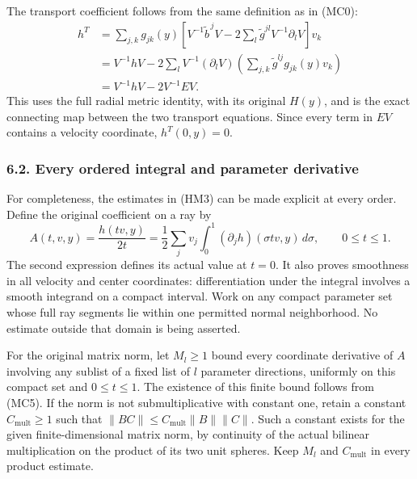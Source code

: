 \documentclass[
  11pt,
]{article}
\begin{document}
The transport coefficient follows from the same definition as in (MC0):
\[
\begin{split}
 h^{T}
 &=\sum_{j,k}g_{jk}(y)
           \left[V^{-1}\widetilde b^{\,j}V
              -2\sum_l\widetilde g^{jl}V^{-1}\partial_lV\right]v_k\\
 &=V^{-1}hV
       -2\sum_lV^{-1}(\partial_lV)
                  \left(\sum_{j,k}\widetilde g^{lj}g_{jk}(y)v_k\right)\\
 &=V^{-1}hV-2V^{-1}EV .
\end{split}
\tag{MC4}
\] This uses the full radial metric identity, with its original
\(H(y)\), and is the exact connecting map between the two transport
equations. Since every term in \(EV\) contains a velocity coordinate,
\(h^{T}(0,y)=0\).

\subsubsection{6.2. Every ordered integral and parameter
derivative}\label{every-ordered-integral-and-parameter-derivative}

For completeness, the estimates in (HM3) can be made explicit at every
order. Define the original coefficient on a ray by \[
 A(t,v,y)=\frac{h(tv,y)}{2t}
 =\frac12\sum_jv_j\int_0^1
          (\partial_jh)(\sigma tv,y)\,d\sigma,\qquad 0\leq t\leq1.
 \tag{MC5}
\] The second expression defines its actual value at \(t=0\). It also
proves smoothness in all velocity and center coordinates:
differentiation under the integral involves a smooth integrand on a
compact interval. Work on any compact parameter set whose full ray
segments lie within one permitted normal neighborhood. No estimate
outside that domain is being asserted.

For the original matrix norm, let \(M_l\geq1\) bound every coordinate
derivative of \(A\) involving any sublist of a fixed list of \(l\)
parameter directions, uniformly on this compact set and
\(0\leq t\leq1\). The existence of this finite bound follows from (MC5).
If the norm is not submultiplicative with constant one, retain a
constant \(C_{\mathrm{mult}}\geq1\) such that
\(\|BC\|\leq C_{\mathrm{mult}}\|B\|\|C\|\). Such a constant exists for
the given finite-dimensional matrix norm, by continuity of the actual
bilinear multiplication on the product of its two unit spheres. Keep
\(M_l\) and \(C_{\mathrm{mult}}\) in every product estimate.
\end{document}
